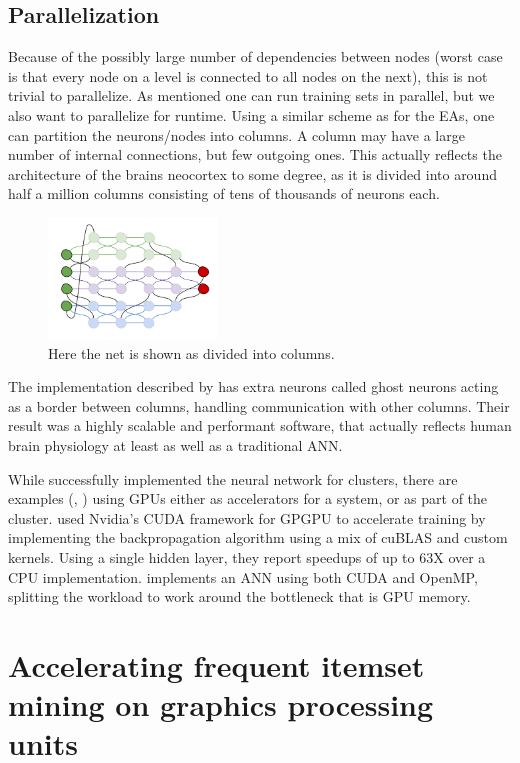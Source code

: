 \documentclass[twocolumn]{article} %
\begin{document}
	\subsection*{Parallelization}
		Because of the possibly large number of dependencies between nodes (worst case is that every node on a level is
		connected to all nodes on the next), this is not trivial to parallelize. As mentioned one can run training sets in
		parallel, but we also want to parallelize for runtime. Using a similar scheme as for the EAs, one can partition
		the neurons/nodes into columns. A column may have a large number of internal connections, but few outgoing ones. This
		actually reflects the architecture of the brains neocortex to some degree, as it is divided into around half a million columns
		consisting of tens of thousands of neurons each.
		\begin{figure}[h]
			\centering
			\includegraphics[width=0.4\textwidth]{cortex}
			\caption{Here the net is shown as divided into columns.}
			\label{fig:columns}
		\end{figure}
		
		The implementation described by \cite{long08} has extra neurons called ghost neurons acting as a border between columns,
		handling communication with other columns. Their result was a highly scalable and performant software, that actually
		reflects human brain physiology at least as well as a traditional ANN.
		
		While \cite{long08} successfully implemented the neural network for clusters, there are examples (\cite{jang08}, \cite{sierra10}) using
		GPUs either as accelerators for a system, or as part of the cluster. \cite{sierra10} used Nvidia's CUDA framework
		for GPGPU to accelerate training by implementing the backpropagation algorithm using a mix of cuBLAS and custom
		kernels. Using a single hidden layer, they report speedups of up to 63X over a CPU implementation. \cite{jang08} implements
		an ANN using both CUDA and OpenMP, splitting the workload to work around the bottleneck that is GPU memory.
		
\section*{Accelerating frequent itemset mining on graphics processing units}
\end{document}
